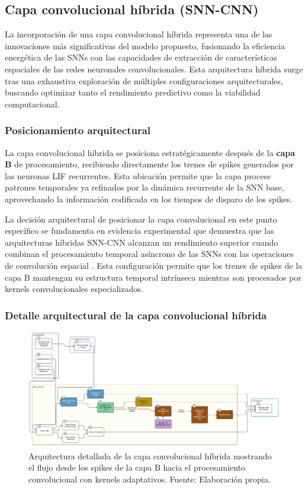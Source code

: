 \subsection{Capa convolucional híbrida (SNN-CNN)}

La incorporación de una capa convolucional híbrida representa una de las innovaciones más significativas del modelo propuesto, fusionando la eficiencia energética de las SNNs con las capacidades de extracción de características espaciales de las redes neuronales convolucionales. Esta arquitectura híbrida surge tras una exhaustiva exploración de múltiples configuraciones arquitecturales, buscando optimizar tanto el rendimiento predictivo como la viabilidad computacional.

\subsubsection {Posicionamiento arquitectural}

La capa convolucional híbrida se posiciona estratégicamente después de la \textbf{capa B} de procesamiento, recibiendo directamente los trenes de spikes generados por las neuronas LIF recurrentes. Esta ubicación permite que la capa procese patrones temporales ya refinados por la dinámica recurrente de la SNN base, aprovechando la información codificada en los tiempos de disparo de los spikes.

La decisión arquitectural de posicionar la capa convolucional en este punto específico se fundamenta en evidencia experimental que demuestra que las arquitecturas híbridas SNN-CNN alcanzan un rendimiento superior cuando combinan el procesamiento temporal asíncrono de las SNNs con las operaciones de convolución espacial \cite{sanaullah_hybrid_2024}. Esta configuración permite que los trenes de spikes de la capa B mantengan su estructura temporal intrínseca mientras son procesados por kernels convolucionales especializados.

\subsubsection{Detalle arquitectural de la capa convolucional híbrida}

\begin{figure}[!htb]
    \centering
    \includegraphics[width=1.0\textwidth]{Imagenes/Arquitectura detallada SNN.png}
    \caption{Arquitectura detallada de la capa convolucional híbrida mostrando el flujo desde los spikes de la capa B hacia el procesamiento convolucional con kernels adaptativos. Fuente: Elaboración propia.}
    \label{fig:Arquitectura detallada SNN}
\end{figure}

